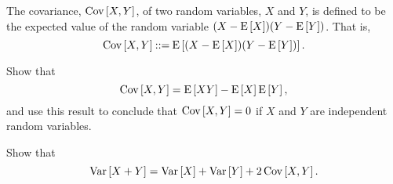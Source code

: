 \documentclass[11pt,twoside]{article}
\begin{document}

\begin{problem}
The covariance, $\covariance{X}{Y}$, of two random variables, $X$ and $Y$,
is defined to be the expected value of the random variable
$(X-\expect{X})(Y-\expect{Y})$.  That is,
\[
\covariance{X}{Y} \eqdef \expect{(X- \expect{X})(Y- \expect{Y})}.
\]

\begin{problemparts}
\problempart
Show that
\begin{equation}\label{altcovar1}
\covariance{X}{Y} = \expect{XY} - \expect{X}\expect{Y},
\end{equation}
and use this result to conclude that $\covariance{X}{Y} = 0$ if $X$ and
$Y$ are independent random variables.


\problempart

Show that 
\[
\variance{X + Y} = \variance{X} + \variance{Y} + 2\covariance{X}{Y}.
\]
  
\end{problemparts}
\end{problem}
\end{document}
